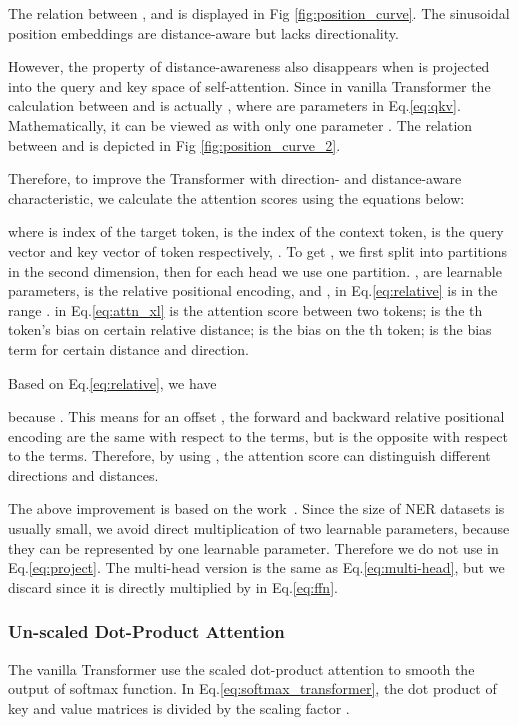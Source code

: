 \documentclass[11pt,a4paper]{article}
\begin{document}
The relation between ,  and  is displayed in Fig \ref{fig:position_curve}. The sinusoidal position embeddings are distance-aware but lacks directionality.

However, the property of distance-awareness also disappears when  is projected into the query and key space of self-attention. Since in vanilla Transformer the calculation between  and  is actually , where  are parameters in Eq.\eqref{eq:qkv}. Mathematically, it can be viewed as  with only one parameter . The relation between  and  is depicted in Fig \ref{fig:position_curve_2}.


Therefore, to improve the Transformer with direction- and distance-aware characteristic, we calculate the attention scores using the equations below:

\vspace{-1em}
{\small
}where  is index of the target token,  is the index of the context token,  is the query vector and key vector of token  respectively, . To get , we first split  into  partitions in the second dimension, then for each head we use one partition. ,  are learnable parameters,
 is the relative positional encoding, and ,  in Eq.\eqref{eq:relative} is in the range .  in Eq.\eqref{eq:attn_xl} is the attention score between two tokens;  is the th token's bias on certain relative distance;  is the bias on the th token;  is the bias term for certain distance and direction.

Based on Eq.\eqref{eq:relative}, we have

\vspace{-1em}
{\small
}because . This means for an offset , the forward and backward relative positional encoding are the same with respect to the  terms, but is the opposite with respect to the  terms. Therefore, by using , the attention score can distinguish different directions and distances.

The above improvement is based on the work~\citep{DBLP:conf/naacl/ShawUV18,DBLP:conf/acl/DaiYYCLS19}.
Since the size of NER datasets is usually small, we avoid direct multiplication of two learnable parameters, because they can be represented by one learnable parameter. Therefore we do not use  in Eq.\eqref{eq:project}. The multi-head version is the same as Eq.\eqref{eq:multi-head}, but we discard  since it is directly multiplied by  in Eq.\eqref{eq:ffn}.



\subsubsection{Un-scaled Dot-Product Attention}
The vanilla Transformer use the scaled dot-product attention to smooth the output of softmax function. In Eq.\eqref{eq:softmax_transformer}, the dot product of key and value matrices is divided by the scaling factor .
\end{document}
